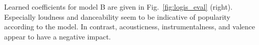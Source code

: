\documentclass{article}
\begin{document}

Learned coefficients for model B are given in Fig.~\ref{fig:logis_eval} (right). Especially loudness and danceability seem to be indicative of popularity according to the model. In contrast, acousticness, instrumentalness, and valence appear to have a negative impact.
\end{document}

